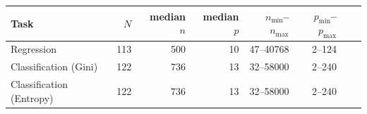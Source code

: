 \begin{tabular}{lrrrrrrr}
\hline
Task & $N$ & median $n$ & median $p$ & $n_{\min}$--$n_{\max}$ & $p_{\min}$--$p_{\max}$ \\
\hline
Regression & 113 & 500 & 10 & 47--40768 & 2--124 \\
Classification (Gini) & 122 & 736 & 13 & 32--58000 & 2--240 \\
Classification (Entropy) & 122 & 736 & 13 & 32--58000 & 2--240 \\
\hline
\end{tabular}
